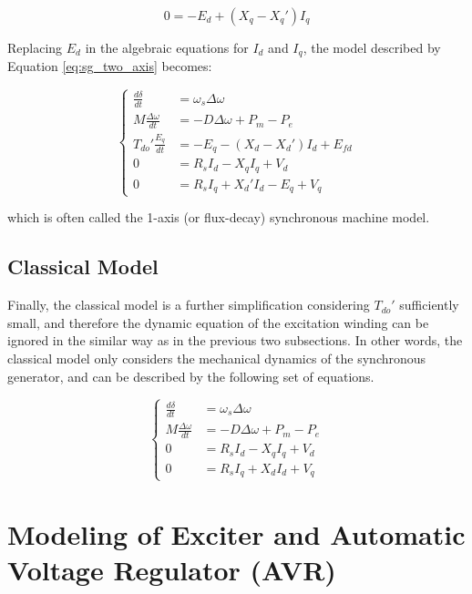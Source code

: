 \begin{equation*}
    0 = -E_d + (X_q - X_q')I_q
\end{equation*}

Replacing $E_d$ in the algebraic equations for $I_d$ and $I_q$, the model
described by Equation \ref{eq:sg_two_axis} becomes:

\begin{equation} \label{eq:sg_one_axis}
    \begin{cases}
        \frac{d\delta}{dt} &= \omega_s \Delta\omega\\
        M\frac{\Delta\omega}{dt} &= -D\Delta\omega + P_m - P_e\\
        T_{do}' \frac{E_q}{dt} &= -E_q - (X_d - X_d')I_d + E_{fd}\\
        0 &= R_s I_d - X_q I_q + V_d \\
        0 &= R_s I_q + X_d' I_d - E_q + V_q
    \end{cases}
\end{equation}

\noindent which is often called the 1-axis (or flux-decay) synchronous machine
model.

\subsection{Classical Model}

Finally, the classical model is a further simplification considering $T_{do}'$
sufficiently small, and therefore the dynamic equation of the excitation winding
can be ignored in the similar way as in the previous two subsections. In other
words, the classical model only considers the mechanical dynamics of the
synchronous generator, and can be described by the following set of equations.

\begin{equation} \label{eq:sg_classical}
    \begin{cases}
        \frac{d\delta}{dt} &= \omega_s \Delta\omega\\
        M\frac{\Delta\omega}{dt} &= -D\Delta\omega + P_m - P_e\\
        0 &= R_s I_d - X_q I_q + V_d \\
        0 &= R_s I_q + X_d I_d + V_q
    \end{cases}
\end{equation}

\section{Modeling of Exciter and Automatic Voltage Regulator (AVR)}